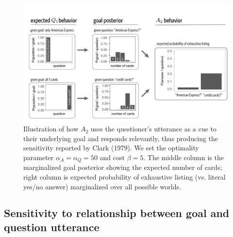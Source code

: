 \documentclass[11pt, floatsintext]{apa6}
\begin{document}
\begin{figure}[t]
\begin{center}
\includegraphics[scale=.5]{simulations/clarkExampleFig}
\end{center}
\caption{Illustration of how $A_2$ uses the questioner's utterance as a cue to their underlying goal and responds relevantly, thus producing the sensitivity reported by Clark (1979). We set the optimality parameter $\alpha_A = \alpha_Q = 50$ and cost $\beta = 5$. The middle column is the marginalized goal posterior showing the expected number of cards; right column is expected probability of exhaustive listing (vs. literal yes/no answer) marginalized over all possible worlds.}
\label{fig:clarkExample}
\end{figure}

\subsection{Sensitivity to relationship between goal and question utterance}

\end{document}
